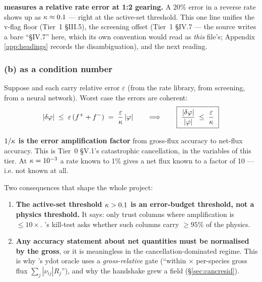 \textbf{\kap{} measures a relative rate error at 1:2 gearing.} A 20\% error in a
reverse rate shows up as $\kappa \approx 0.1$ --- right at the active-set
threshold. This one line unifies the v-flag floor (Tier~1 \S III.5), the
screening offset (Tier~1 \S IV.7 --- the source writes a bare ``\S IV.7'' here,
which its own convention would read as \emph{this} file's; Appendix
\ref{app:headings} records the disambiguation), and the next reading.

\subsubsection{(b) \texorpdfstring{\kap}{kappa} as a condition number}
\label{sec:kappa-cond}

Suppose \fp{} and \fm{} each carry relative error $\varepsilon$ (from the rate
library, from screening, from a neural network). Worst case the errors are
coherent:
%
\begin{equation}
|\delta\varphi| \;\le\; \varepsilon\,(f^{+} + f^{-})
\;=\; \frac{\varepsilon}{\kappa}\,|\varphi|
\qquad\Longrightarrow\qquad
\boxed{\ \frac{|\delta\varphi|}{|\varphi|} \;\le\;
\frac{\varepsilon}{\kappa}\ }
\label{eq:kappacond}
\end{equation}

\textbf{$1/\kappa$ is the error amplification factor} from gross-flux accuracy to
net-flux accuracy. This is Tier~0 \S V.1's catastrophic cancellation, in the
variables of this tier. At $\kappa = 10^{-3}$ a rate known to 1\% gives a net flux
known to a factor of 10 --- i.e. not known at all.

Two consequences that shape the whole project:

\begin{enumerate}
\item \textbf{The active-set threshold $\kappa > 0.1$ is an error-budget
  threshold, not a physics threshold.} It says: only trust columns where
  amplification is $\le 10\times$. 's kill-test asks whether
  such columns carry $\ge 95\%$ of the physics.
\item \textbf{Any accuracy statement about net quantities must be normalised by
  the gross}, or it is meaningless in the cancellation-dominated regime. This is
  why 's ydot oracle uses a \emph{gross-relative}
  gate (``within  $\times$ per-species gross flux
  $\sum_j|\nu_{ij}|R_j$''), and why the handshake grew a 
  field (\S\ref{sec:cancresid}).
\end{enumerate}

